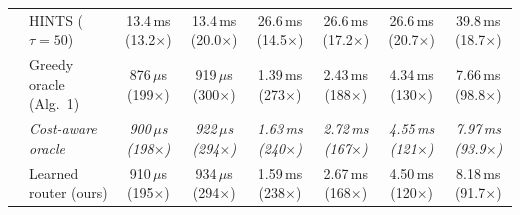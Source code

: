 {\begin{tabular}{llcccccc}
 & HINTS ($\tau{=}50$) & 13.4\,ms (13.2$\times$) & 13.4\,ms (20.0$\times$) & 26.6\,ms (14.5$\times$) & 26.6\,ms (17.2$\times$) & 26.6\,ms (20.7$\times$) & 39.8\,ms (18.7$\times$) \\
 & Greedy oracle (Alg.~1) & 876\,$\mu$s (199$\times$) & 919\,$\mu$s (300$\times$) & 1.39\,ms (273$\times$) & 2.43\,ms (188$\times$) & 4.34\,ms (130$\times$) & 7.66\,ms (98.8$\times$) \\
 & \textit{Cost-aware oracle} & \textit{900\,$\mu$s (198$\times$)} & \textit{922\,$\mu$s (294$\times$)} & \textit{1.63\,ms (240$\times$)} & \textit{2.72\,ms (167$\times$)} & \textit{4.55\,ms (121$\times$)} & \textit{7.97\,ms (93.9$\times$)} \\
 & Learned router (ours) & 910\,$\mu$s (195$\times$) & 934\,$\mu$s (294$\times$) & 1.59\,ms (238$\times$) & 2.67\,ms (168$\times$) & 4.50\,ms (120$\times$) & 8.18\,ms (91.7$\times$) \\
\bottomrule
\end{tabular}}
